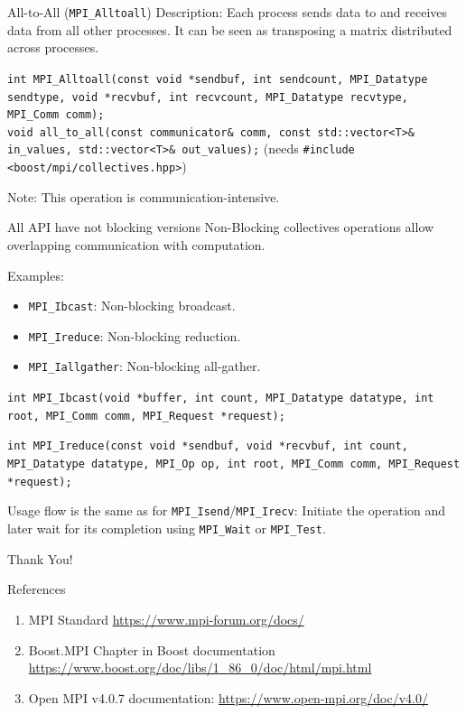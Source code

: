 \documentclass{beamer}
\begin{document}
\begin{frame}{All-to-All (\texttt{MPI\_Alltoall})}
  Description: Each process sends data to and receives data from all other processes. It can be seen as transposing a matrix distributed across processes.

  {
    \footnotesize
    \texttt{int MPI\_Alltoall(const void *sendbuf, int sendcount, MPI\_Datatype sendtype, void *recvbuf, int recvcount, MPI\_Datatype recvtype, MPI\_Comm comm);} \\
    \texttt{void all\_to\_all(const communicator\& comm, const std::vector<T>\& in\_values, std::vector<T>\& out\_values);} (needs \texttt{\#include <boost/mpi/collectives.hpp>})
  }

  Note: This operation is communication-intensive.
\end{frame}

\begin{frame}{All API have not blocking versions}
  Non-Blocking collectives operations allow overlapping communication with computation.

  Examples:
  \begin{itemize}
    \item \texttt{MPI\_Ibcast}: Non-blocking broadcast.
    \item \texttt{MPI\_Ireduce}: Non-blocking reduction.
    \item \texttt{MPI\_Iallgather}: Non-blocking all-gather.
  \end{itemize}

  \texttt{int MPI\_Ibcast(void *buffer, int count, MPI\_Datatype datatype, int root, MPI\_Comm comm, MPI\_Request *request);}

  \texttt{int MPI\_Ireduce(const void *sendbuf, void *recvbuf, int count, MPI\_Datatype datatype, MPI\_Op op, int root, MPI\_Comm comm, MPI\_Request *request);}

  Usage flow is the same as for \texttt{MPI\_Isend}/\texttt{MPI\_Irecv}: Initiate the operation and later wait for its completion using \texttt{MPI\_Wait} or \texttt{MPI\_Test}.
\end{frame}

\begin{frame}
    \centering
    \Huge{Thank You!}
\end{frame}

\begin{frame}{References}
  \begin{enumerate}
    \item MPI Standard \href{https://www.mpi-forum.org/docs/}{https://www.mpi-forum.org/docs/}
    \item Boost.MPI Chapter in Boost documentation \href{https://www.boost.org/doc/libs/1_86_0/doc/html/mpi.html}{https://www.boost.org/doc/libs/1\_86\_0/doc/html/mpi.html}
    \item Open MPI v4.0.7 documentation: \href{https://www.open-mpi.org/doc/v4.0/}{https://www.open-mpi.org/doc/v4.0/}
  \end{enumerate}
\end{frame}
\end{document}
